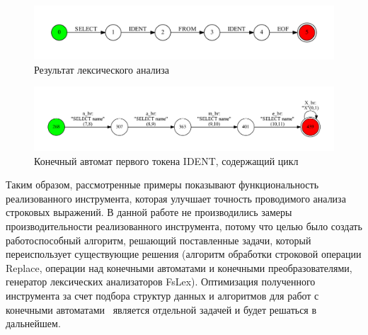 \begin{figure}[h!]
\begin{center}
\includegraphics[width=1.0\textwidth]{Polubelova/TokenEx}
\caption{Результат лексического анализа}
\label{fig:TokenEx} 
\end{center}
\end{figure}

\begin{figure}[h!]
\begin{center}
\includegraphics[width=1.0\textwidth]{Polubelova/token}
\caption{Конечный автомат первого токена IDENT, содержащий цикл}
\label{fig:token} 
\end{center}
\end{figure}



Таким образом, рассмотренные примеры показывают функциональность реализованного инструмента, которая улучшает точность проводимого анализа строковых выражений. В данной работе не производились замеры производительности реализованного инструмента, потому что целью было создать работоспособный алгоритм, решающий поставленные задачи, который переиспользует существующие решения (алгоритм обработки строковой операции Replace, операции над конечными автоматами и конечными преобразователями, генератор лексических анализаторов FsLex). Оптимизация полученного инструмента за счет подбора структур данных и алгоритмов для работ с конечными автоматами~\cite{AlgoFSA} является отдельной задачей и будет решаться в дальнейшем. 


